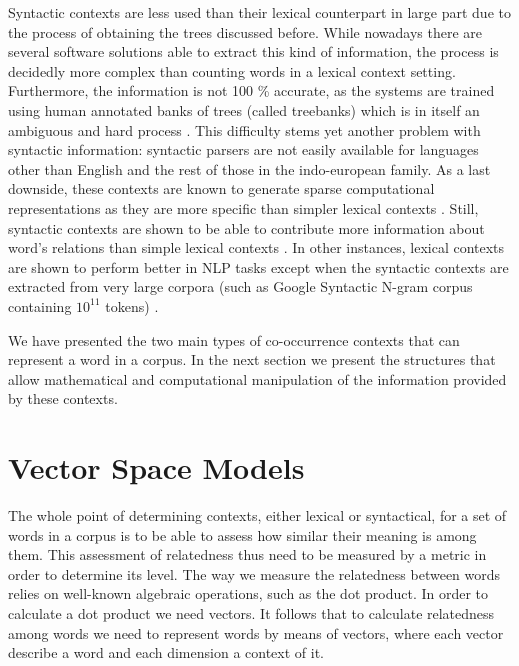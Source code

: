 Syntactic contexts are less used than their lexical counterpart in large part due to the process of obtaining the trees discussed before. While nowadays there are several software solutions able to extract this kind of information, the process is decidedly more complex than counting words in a lexical context setting. Furthermore, the information is not 100 \% accurate, as the systems are trained using human annotated banks of trees (called treebanks) which is in itself an ambiguous and hard process \cite{JurafskyM09,perinet2015}.  This difficulty stems yet another problem with syntactic information: syntactic parsers are not easily available for languages other than English and the rest of those in  the indo-european family. As a last downside, these contexts are known to generate sparse computational representations as they are more specific than simpler lexical contexts \cite{sahlgren2006word}. Still, syntactic contexts are shown to be able to contribute more information about word's relations than simple lexical contexts \cite{Lin1997,pado2003constructing,turney2010,baroni2010distributional,LevyG14,Panchenko2017}. In other instances, lexical contexts are shown to perform better in NLP tasks except when the syntactic contexts are extracted from very large corpora (such as Google Syntactic N-gram corpus \cite{goldberg2013dataset} containing $10^{11}$ tokens) \cite{kiela2014systematic}.

We have presented the two  main types of co-occurrence contexts that can represent a word in a corpus. In the next section we present the structures that allow mathematical and computational manipulation of the information provided by these contexts.









\section{Vector Space Models}

The whole point of determining contexts, either lexical or syntactical, for a set of words in a corpus is to be able to assess how similar their meaning is among them. This assessment of relatedness thus need to be measured by a metric in order to determine its level. The way we measure the relatedness between words relies on well-known algebraic operations, such as the dot  product. In order to calculate a dot product we need vectors. It follows that to calculate relatedness among words we need to represent words by means of vectors, where each vector describe a word and each dimension a context of it. 

